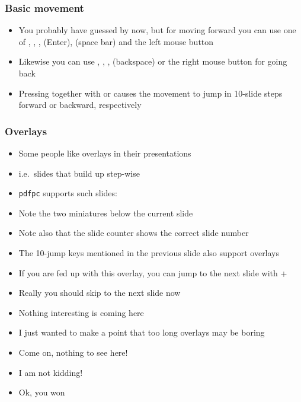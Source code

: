 \documentclass{beamer}
\newcommand{\pdfpc}{\texttt{pdfpc}\xspace}
\begin{document}
\begin{frame}
  \frametitle{Basic movement}
  \begin{itemize}
    \item You probably have guessed by now, but for moving forward you can use
      one of \RArrow, \DArrow, \PgDown, \Return (Enter), \Spacebar (space bar)
      and the left mouse button
    \item Likewise you can use \LArrow, \UArrow, \PgUp, \BSpace (backspace) or
      the right mouse button for going back
    \item Pressing \Shift together with \RArrow or \LArrow causes the movement
      to jump in 10-slide steps forward or backward, respectively
  \end{itemize}
\end{frame}

\begin{frame}
  \frametitle{Overlays}
  \begin{itemize}
    \item Some people like overlays in their presentations
    \pause
    \item i.e.\ slides that build up step-wise
    \pause
    \item \pdfpc supports such slides:
    \pause
    \item Note the two miniatures below the current slide
    \pause
    \item Note also that the slide counter shows the correct slide number
    \pause
    \item The 10-jump keys mentioned in the previous slide also support
      overlays
    \pause
    \item If you are fed up with this overlay, you can jump to the next slide
      with \Shift+\PgDown
    \pause
    \item Really you should skip to the next slide now
    \pause
    \item Nothing interesting is coming here
    \pause
    \item I just wanted to make a point that too long overlays may be boring
    \pause
    \item Come on, nothing to see here!
    \pause
    \item I am not kidding!
    \pause
    \item Ok, you won
  \end{itemize}
\end{frame}
\end{document}
